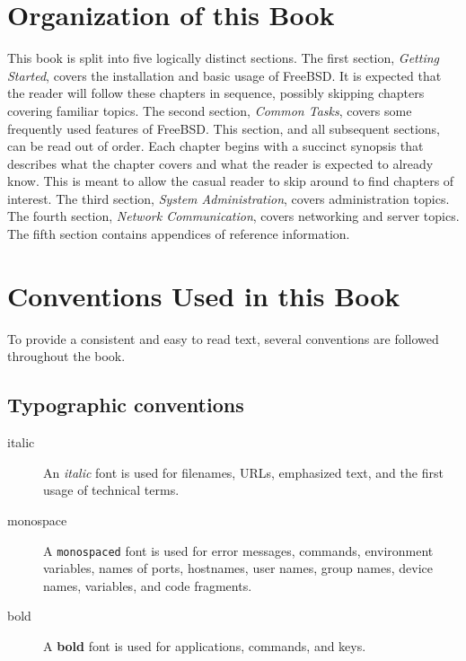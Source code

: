 \section{Organization of this Book}

This book is split into five logically distinct sections.
The first section, \emph{Getting Started}, covers the installation and basic
usage of FreeBSD.
It is expected that the reader will follow these chapters in sequence, possibly
skipping chapters covering familiar topics.
The second section, \emph{Common Tasks}, covers some frequently used features of
FreeBSD.
This section, and all subsequent sections, can be read out of order.
Each chapter begins with a succinct synopsis that describes what the chapter
covers and what the reader is expected to already know.
This is meant to allow the casual reader to skip around to find chapters of
interest.
The third section, \emph{System Administration}, covers administration topics.
The fourth section, \emph{Network Communication}, covers networking and server
topics.
The fifth section contains appendices of reference information.















\section{Conventions Used in this Book}

To provide a consistent and easy to read text, several conventions are followed
throughout the book.

\subsection{Typographic conventions}

\begin{description}
\item[italic]
   An \emph{italic} font is used for filenames, URLs, emphasized text, and the
   first usage of technical terms.
\item[monospace]
   A \texttt{monospaced} font is used for error messages, commands, environment
   variables, names of ports, hostnames, user names, group names, device names,
   variables, and code fragments.
\item[bold]
   A \textbf{bold} font is used for applications, commands, and keys.
\end{description}


